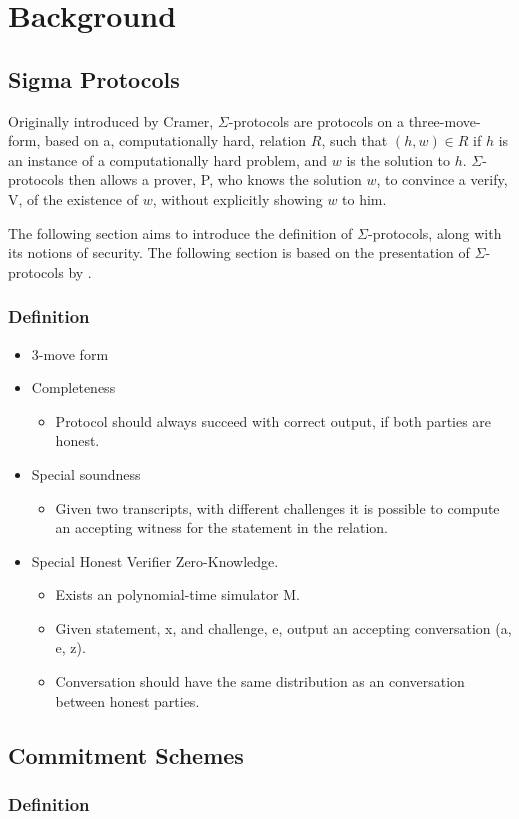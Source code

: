 \chapter{Background}
\label{ch:background}


\section{Sigma Protocols}
\label{sec:sigma_protocols}
Originally introduced by Cramer, $\Sigma$-protocols are protocols on a
three-move-form, based on a, computationally hard, relation $R$, such that $(h, w) \in R$
if $h$ is an instance of a computationally hard problem, and $w$ is
the solution to $h$. $\Sigma$-protocols then allows a prover, P, who knows the
solution $w$, to convince a verify, V, of the existence of $w$, without
explicitly showing $w$ to him.

The following section aims to introduce the definition of $\Sigma$-protocols,
along with its notions of security. The following section is based on the
presentation of $\Sigma$-protocols by \citet{on-sigma-protocols}.

\subsection{Definition}
\label{sec:sigma_definition}
\begin{itemize}
  \item 3-move form
  \item Completeness
    \begin{itemize}
      \item Protocol should always succeed with correct output, if both parties are honest.
    \end{itemize}
  \item Special soundness
    \begin{itemize}
      \item Given two transcripts, with different challenges it is possible to
        compute an accepting witness for the statement in the relation.
    \end{itemize}
  \item Special Honest Verifier Zero-Knowledge.
    \begin{itemize}
      \item Exists an polynomial-time simulator M.
      \item Given statement, x, and challenge, e, output an accepting
        conversation (a, e, z).
      \item Conversation should have the same distribution as an conversation
        between honest parties.
    \end{itemize}
\end{itemize}

\section{Commitment Schemes}
\label{sec:commitment}

\subsection{Definition}
\label{sec:commitment:definition}




